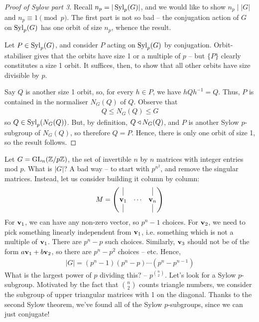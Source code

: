 \documentclass{../../template/note}
\begin{document}
    \begin{proof}[Proof of Sylow part 3]
        Recall $n_p = |\operatorname{Syl}_p(G)|$, and we would like to show $n_p \mid |G|$ and $n_p \equiv 1 \pmod p$. The first part is not so bad -- the conjugation action of $G$ on $\operatorname{Syl}_p(G)$ has one orbit of size $n_p$, whence the result.

        Let $P \in \operatorname{Syl}_p(G)$, and consider $P$ acting on $\operatorname{Syl}_p(G)$ by conjugation. Orbit-stabiliser gives that the orbits have size 1 or a multiple of $p$ -- but $\{P\}$ clearly constitutes a size 1 orbit. It suffices, then, to show that all other orbits have size divisible by $p$.

        Say $Q$ is another size 1 orbit, so, for every $h \in P$, we have $hQh^{-1} = Q$. Thus, $P$ is contained in the normaliser $N_G(Q)$ of $Q$. Observe that
        \begin{align*}
            Q \leq N_G(Q) \leq G
        \end{align*}
        so $Q \in \operatorname{Syl}_p(N_G(Q))$. But, by definition, $Q \triangleleft N_G(Q)$, and $P$ is another Sylow $p$-subgroup of $N_G(Q)$, so therefore $Q=P$. Hence, there is only one orbit of size 1, so the result follows.
    \end{proof}
    
    \begin{example*}
        Let $G = \operatorname{GL}_n(\mathbb Z/p\mathbb Z)$, the set of invertible $n$ by $n$ matrices with integer entries mod $p$. What is $|G|$? A bad way -- to start with $p^{n^2}$, and remove the singular matrices. Instead, let us consider building it column by column:
        \begin{align*}
            M = \begin{pmatrix}
                \vline & & \vline \\ 
                \V v_1 & \cdots & \V v_n \\
                \vline & & \vline \\ 
            \end{pmatrix}   
        \end{align*}
        For $\V v_1$, we can have any non-zero vector, so $p^n-1$ choices. For $\V v_2$, we need to pick something linearly independent from $\V v_1$, i.e. something which is not a multiple of $\V v_1$. There are $p^n-p$ such choices. Similarly, $\V v_3$ should not be of the form $a \V v_1 + b \V v_2$, so there are $p^n - p^2$ choices -- etc. Hence,
        \begin{align*}
            |G| = (p^n-1)(p^n-p)\cdots(p^n-p^{n-1})
        \end{align*}
        What is the largest power of $p$ dividing this? -- $p^{\binom{n}{2}}$. Let's look for a Sylow $p$-subgroup. Motivated by the fact that $\binom n 2$ counts triangle numbers, we consider the subgroup of upper triangular matrices with 1 on the diagonal. Thanks to the second Sylow theorem, we've found all of the Sylow $p$-subgroups, since we can just conjugate!
    \end{example*}
\end{document}
